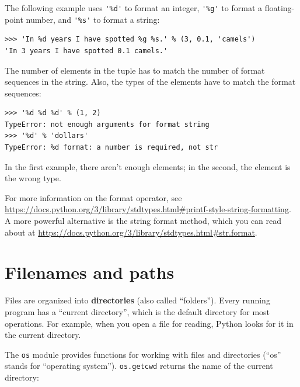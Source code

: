 \documentclass[10pt]{book}
\begin{document}
The following example uses \verb"'%d'" to format an integer,
\verb"'%g'" to format a floating-point number, and
\verb"'%s'" to format a string:

\begin{verbatim}
>>> 'In %d years I have spotted %g %s.' % (3, 0.1, 'camels')
'In 3 years I have spotted 0.1 camels.'
\end{verbatim}
%
The number of elements in the tuple has to match the number
of format sequences in the string.  Also, the types of the
elements have to match the format sequences:

\begin{verbatim}
>>> '%d %d %d' % (1, 2)
TypeError: not enough arguments for format string
>>> '%d' % 'dollars'
TypeError: %d format: a number is required, not str
\end{verbatim}
%
In the first example, there aren't enough elements; in the
second, the element is the wrong type.

For more information on the format operator, see
\url{https://docs.python.org/3/library/stdtypes.html#printf-style-string-formatting}.  A more powerful alternative is the string
format method, which you can read about at
\url{https://docs.python.org/3/library/stdtypes.html#str.format}.




\section{Filenames and paths}
\label{paths}

Files are organized into {\bf directories} (also called ``folders'').
Every running program has a ``current directory'', which is the
default directory for most operations.
For example, when you open a file for reading, Python looks for it in the
current directory.

The {\tt os} module provides functions for working with files and
directories (``os'' stands for ``operating system'').  {\tt os.getcwd}
returns the name of the current directory:
\end{document}
